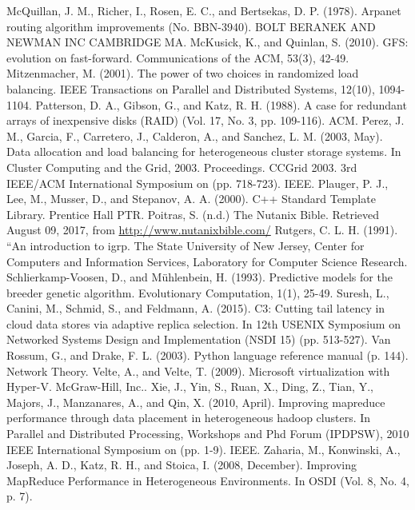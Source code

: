 \documentclass[12pt]{article}
\begin{document}
\begin{thebibliography}{99}
   McQuillan, J. M., Richer, I., Rosen, E. C., and Bertsekas, D. P. (1978). Arpanet routing algorithm improvements (No. BBN-3940). BOLT BERANEK AND NEWMAN INC CAMBRIDGE MA.
   McKusick, K., and Quinlan, S. (2010). GFS: evolution on fast-forward. Communications of the ACM, 53(3), 42-49.
   Mitzenmacher, M. (2001). The power of two choices in randomized load balancing. IEEE Transactions on Parallel and Distributed Systems, 12(10), 1094-1104.
   Patterson, D. A., Gibson, G., and Katz, R. H. (1988). A case for redundant arrays of inexpensive disks (RAID) (Vol. 17, No. 3, pp.  109-116). ACM.
   Perez, J. M., Garcia, F., Carretero, J., Calderon, A., and Sanchez, L. M. (2003, May). Data allocation and load balancing for heterogeneous cluster storage systems. In Cluster Computing and the Grid, 2003. Proceedings. CCGrid 2003. 3rd IEEE/ACM International Symposium on (pp. 718-723). IEEE.
   Plauger, P. J., Lee, M., Musser, D., and Stepanov, A. A. (2000). C++ Standard Template Library. Prentice Hall PTR.
   Poitras, S. (n.d.) The Nutanix Bible. Retrieved August 09, 2017, from \url{http://www.nutanixbible.com/}
   Rutgers, C. L. H. (1991). “An introduction to igrp. The State University of New Jersey, Center for Computers and Information Services, Laboratory for Computer Science Research.
   Schlierkamp-Voosen, D., and Mühlenbein, H. (1993). Predictive models for the breeder genetic algorithm. Evolutionary Computation, 1(1), 25-49.
   Suresh, L., Canini, M., Schmid, S., and Feldmann, A. (2015). C3: Cutting tail latency in cloud data stores via adaptive replica selection. In 12th USENIX Symposium on Networked Systems Design and Implementation (NSDI 15) (pp. 513-527).
   Van Rossum, G., and Drake, F. L. (2003). Python language reference manual (p. 144). Network Theory.
   Velte, A., and Velte, T. (2009). Microsoft virtualization with Hyper-V. McGraw-Hill, Inc..
   Xie, J., Yin, S., Ruan, X., Ding, Z., Tian, Y., Majors, J., Manzanares, A., and Qin, X. (2010, April). Improving mapreduce performance through data placement in heterogeneous hadoop clusters. In Parallel and Distributed Processing, Workshops and Phd Forum (IPDPSW), 2010 IEEE International Symposium on (pp. 1-9). IEEE.
   Zaharia, M., Konwinski, A., Joseph, A. D., Katz, R.  H., and Stoica, I. (2008, December). Improving MapReduce Performance in Heterogeneous Environments. In OSDI (Vol. 8, No. 4, p. 7).


 \end{thebibliography}
\end{document}
